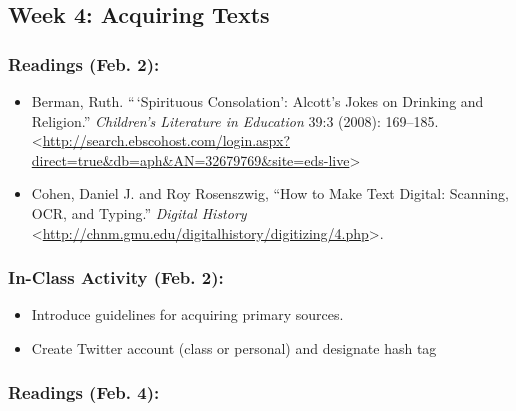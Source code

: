 \documentclass[]{article}
\begin{document}
\subsection{Week 4: Acquiring Texts}\label{week-4-acquiring-texts}

\subsubsection{Readings (Feb. 2):}\label{readings-feb.-2}

\begin{itemize}
\itemsep1pt\parskip0pt
\item
  Berman, Ruth. ``\,`Spirituous Consolation': Alcott's Jokes on Drinking
  and Religion.'' \emph{Children's Literature in Education} 39:3 (2008):
  169--185.
  \textless{}\url{http://search.ebscohost.com/login.aspx?direct=true\&db=aph\&AN=32679769\&site=eds-live}\textgreater{}
\item
  Cohen, Daniel J. and Roy Rosenszwig, ``How to Make Text Digital:
  Scanning, OCR, and Typing.'' \emph{Digital History}
  \textless{}\url{http://chnm.gmu.edu/digitalhistory/digitizing/4.php}\textgreater{}.
\end{itemize}

\subsubsection{In-Class Activity (Feb.
2):}\label{in-class-activity-feb.-2}

\begin{itemize}
\itemsep1pt\parskip0pt
\item
  Introduce guidelines for acquiring primary sources.
\item
  Create Twitter account (class or personal) and designate hash tag
\end{itemize}

\subsubsection{Readings (Feb. 4):}\label{readings-feb.-4}
\end{document}
